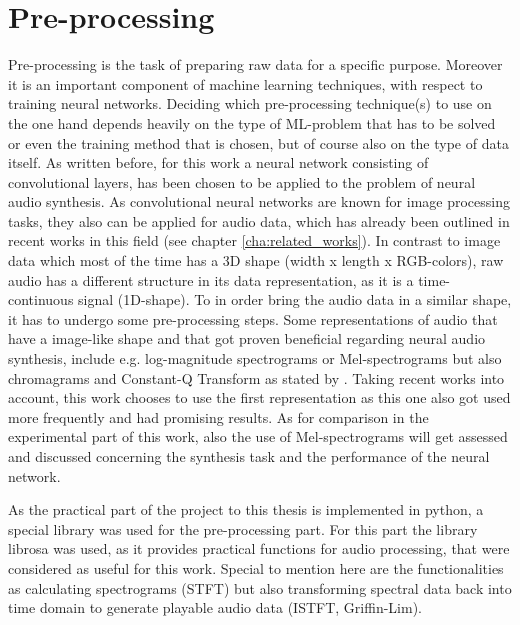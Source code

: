 \section{Pre-processing}
\label{sec:app_pre-processing}
Pre-processing is the task of preparing raw data for a specific purpose. Moreover it is an important component of machine learning techniques, with respect to training neural networks. Deciding which pre-processing technique(s) to use on the one hand depends heavily on the type of ML-problem that has to be solved or even the training method that is chosen, but of course also on the type of data itself. As written before, for this work a neural network consisting of convolutional layers, has been chosen to be applied to the problem of neural audio synthesis. As convolutional neural networks are known for image processing tasks, they also can be applied for audio data, which has already been outlined in recent works in this field (see chapter \ref{cha:related_works}). In contrast to image data which most of the time has a 3D shape (width x length x RGB-colors), raw audio has a different structure in its data representation, as it is a time-continuous signal (1D-shape). To in order bring the audio data in a similar shape, it has to undergo some pre-processing steps. Some representations of audio that have a image-like shape and that got proven beneficial regarding neural audio synthesis, include e.g. log-magnitude spectrograms or Mel-spectrograms but also chromagrams and Constant-Q Transform as stated by \cite{choi2018tutorial}. Taking recent works into account, this work chooses to use the first representation as this one also got used more frequently and had promising results. As for comparison in the experimental part of this work, also the use of Mel-spectrograms will get assessed and discussed concerning the synthesis task and the performance of the neural network. 

As the practical part of the project to this thesis is implemented in python, a special library was used for the pre-processing part. For this part the library librosa \cite{brian_mcfee_2022_6097378} was used, as it provides practical functions for audio processing, that were considered as useful for this work. Special to mention here are the functionalities as calculating spectrograms (STFT) but also transforming spectral data back into time domain to generate playable audio data (ISTFT, Griffin-Lim).



